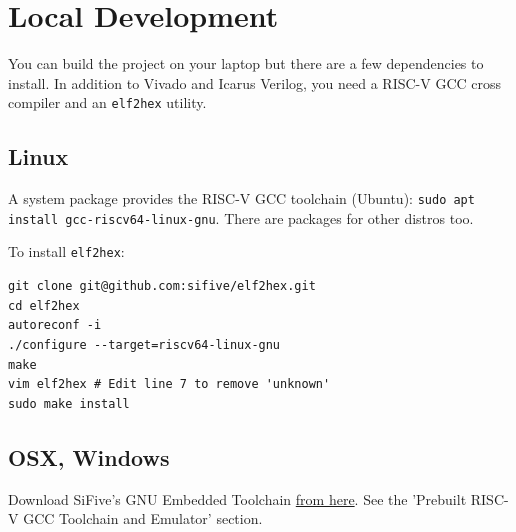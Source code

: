 \documentclass[11pt]{article}
\begin{document}

\newpage

\appendix
\section{Local Development}
You can build the project on your laptop but there are a few dependencies to install.
In addition to Vivado and Icarus Verilog, you need a RISC-V GCC cross compiler and an \verb|elf2hex| utility.

\subsection{Linux}
A system package provides the RISC-V GCC toolchain (Ubuntu): \verb|sudo apt install gcc-riscv64-linux-gnu|.
There are packages for other distros too.

To install \verb|elf2hex|:
\begin{verbatim}
git clone git@github.com:sifive/elf2hex.git
cd elf2hex
autoreconf -i
./configure --target=riscv64-linux-gnu
make
vim elf2hex # Edit line 7 to remove 'unknown'
sudo make install
\end{verbatim}

\subsection{OSX, Windows}
Download SiFive's GNU Embedded Toolchain \href{https://www.sifive.com/boards}{from here}.
See the 'Prebuilt RISC-V GCC Toolchain and Emulator' section.
\end{document}
